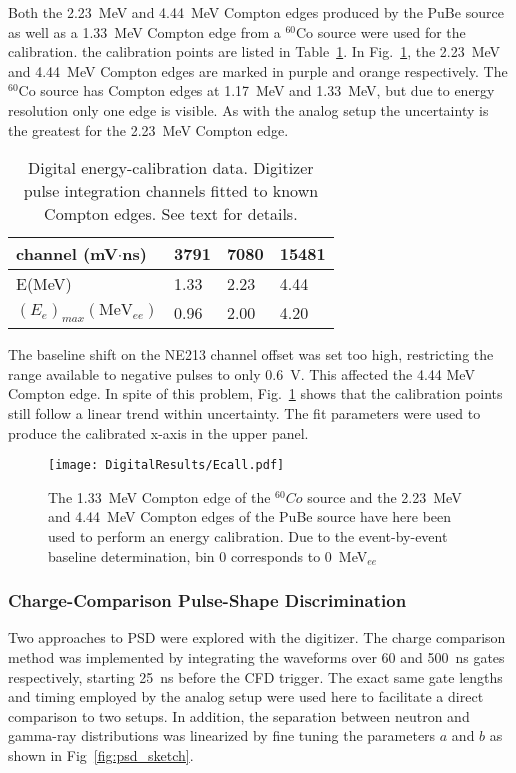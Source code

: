 \documentclass[main.tex]{subfiles}
\begin{document}
Both the \SI{2.23}{\MeV} and \SI{4.44}{\MeV} Compton edges produced by the PuBe source as well as a \SI{1.33}{MeV} Compton edge from a $^{60}$Co source were used for the calibration. the calibration points are listed in Table~\ref{tab:knox_d}. In Fig.~\ref{fig:D_QDC}, the \SI{2.23}{\MeV} and \SI{4.44}{\MeV} Compton edges are marked in purple and orange respectively. The $^{60}$Co source has Compton edges at \SI{1.17}{\MeV} and \SI{1.33}{\MeV}, but due to energy resolution only one edge is visible.  As with the analog setup the uncertainty is the greatest for the \SI{2.23}{\MeV} Compton edge.

\begin{table}[hb]
	\center
	\begin{tabular}{|l|l|l|l|}
	\hline
	channel (mV$\cdot$ns)            & 3791 & 7080  & 15481  \\
	\hline
	E(MeV)          & 1.33    & 2.23  & 4.44 \\
	\hline
	$(E_{e})_{max}(\textrm{MeV}_{ee})$ & 0.96    & 2.00  & 4.20 \\
	\hline
	\end{tabular}
   	\captionsetup{width=0.435\linewidth}
	\caption[Digital energy-calibration data.]{Digital energy-calibration data. Digitizer pulse integration channels fitted to known Compton edges. See text for details.}
	\label{tab:knox_d}
\end{table}

The baseline shift on the NE213 channel offset was set too high, restricting the range available to negative pulses to only \SI{0.6}{V}. This affected the 4.44 \si{\MeV} Compton edge. In spite of this problem, Fig.~\ref{fig:D_QDC} shows that the calibration points still follow a linear trend within uncertainty. The fit parameters were used to produce the calibrated x-axis in the upper panel.

\begin{figure}[ht]
    \centering
        \texttt{[image: DigitalResults/Ecall.pdf]}
        \caption[Energy calibration of the digital setup]{The \SI{1.33}{\MeV} Compton edge of the $^{60}Co$ source and the \SI{2.23}{\MeV} and \SI{4.44}{\MeV} Compton edges of the PuBe source have here been used to perform an energy calibration. Due to the event-by-event baseline determination, bin 0 corresponds to \SI{0}{\MeV}$_{ee}$}
    \label{fig:D_QDC}
\end{figure}

\subsubsection{Charge-Comparison Pulse-Shape Discrimination}
Two approaches to PSD were explored with the digitizer. The charge comparison method was implemented by integrating the waveforms over 60 and \SI{500}{ns} gates respectively, starting \SI{25}{ns} before the CFD trigger. The exact same gate lengths and timing employed by the analog setup were used here to facilitate a direct comparison to two setups. In addition, the separation between neutron and gamma-ray distributions was linearized by fine tuning the parameters $a$ and $b$ as shown in Fig~\ref{fig:psd_sketch}.
\end{document}
